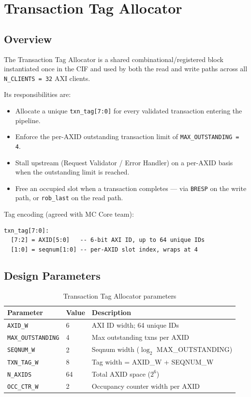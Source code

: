 \section{Transaction Tag Allocator}
\subsection{Overview}

The Transaction Tag Allocator is a shared combinational/registered block
instantiated once in the CIF and used by both the read and write paths
across all \texttt{N\_CLIENTS = 32} AXI clients.

Its responsibilities are:
\begin{itemize}
  \item Allocate a unique \texttt{txn\_tag[7:0]} for every validated
        transaction entering the pipeline.
  \item Enforce the per-AXID outstanding transaction limit of
        \texttt{MAX\_OUTSTANDING = 4}.
  \item Stall upstream (Request Validator / Error Handler) on a per-AXID
        basis when the outstanding limit is reached.
  \item Free an occupied slot when a transaction completes — via
        \texttt{BRESP} on the write path, or \texttt{rob\_last} on the
        read path.
\end{itemize}

Tag encoding (agreed with MC Core team):
\begin{lstlisting}
txn_tag[7:0]:
  [7:2] = AXID[5:0]   -- 6-bit AXI ID, up to 64 unique IDs
  [1:0] = seqnum[1:0] -- per-AXID slot index, wraps at 4
\end{lstlisting}

\subsection{Design Parameters}

\begin{table}[h!]
\centering
\begin{tabular}{lll}
\toprule
\textbf{Parameter} & \textbf{Value} & \textbf{Description} \\
\midrule
\texttt{AXID\_W}           & 6   & AXI ID width; 64 unique IDs \\
\texttt{MAX\_OUTSTANDING}  & 4   & Max outstanding txns per AXID \\
\texttt{SEQNUM\_W}         & 2   & Seqnum width (\(\log_2\) MAX\_OUTSTANDING) \\
\texttt{TXN\_TAG\_W}       & 8   & Tag width = AXID\_W + SEQNUM\_W \\
\texttt{N\_AXIDS}          & 64  & Total AXID space ($2^6$) \\
\texttt{OCC\_CTR\_W}       & 2   & Occupancy counter width per AXID \\
\bottomrule
\end{tabular}
\caption{Transaction Tag Allocator parameters}
\end{table}

